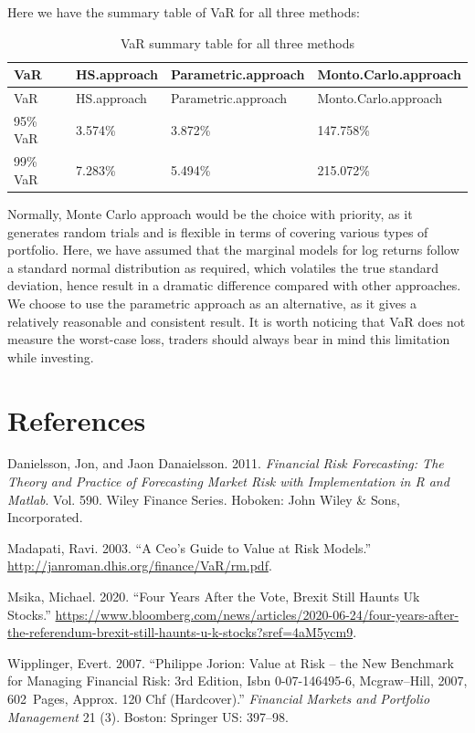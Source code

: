 \documentclass[]{article}
\begin{document}
Here we have the summary table of VaR for all three methods:

\begin{longtable}[]{@{}llll@{}}
\caption{VaR summary table for all three methods}\tabularnewline
\toprule
VaR & HS.approach & Parametric.approach &
Monto.Carlo.approach\tabularnewline
\midrule
\endfirsthead
\toprule
VaR & HS.approach & Parametric.approach &
Monto.Carlo.approach\tabularnewline
\midrule
\endhead
95\% VaR & 3.574\% & 3.872\% & 147.758\%\tabularnewline
99\% VaR & 7.283\% & 5.494\% & 215.072\%\tabularnewline
\bottomrule
\end{longtable}

Normally, Monte Carlo approach would be the choice with priority, as it
generates random trials and is flexible in terms of covering various
types of portfolio. Here, we have assumed that the marginal models for
log returns follow a standard normal distribution as required, which
volatiles the true standard deviation, hence result in a dramatic
difference compared with other approaches. We choose to use the
parametric approach as an alternative, as it gives a relatively
reasonable and consistent result. It is worth noticing that VaR does not
measure the worst-case loss, traders should always bear in mind this
limitation while investing.

\vspace{3cm}

\hypertarget{references}{%
\section{References}\label{references}}

\hypertarget{refs}{}
\leavevmode\hypertarget{ref-DanielssonJon2011FRFT}{}%
Danielsson, Jon, and Jaon Danaielsson. 2011. \emph{Financial Risk
Forecasting: The Theory and Practice of Forecasting Market Risk with
Implementation in R and Matlab}. Vol. 590. Wiley Finance Series.
Hoboken: John Wiley \& Sons, Incorporated.

\leavevmode\hypertarget{ref-Ravi}{}%
Madapati, Ravi. 2003. ``A Ceo's Guide to Value at Risk Models.''
\url{http://janroman.dhis.org/finance/VaR/rm.pdf}.

\leavevmode\hypertarget{ref-Michael}{}%
Msika, Michael. 2020. ``Four Years After the Vote, Brexit Still Haunts
Uk Stocks.''
\url{https://www.bloomberg.com/news/articles/2020-06-24/four-years-after-the-referendum-brexit-still-haunts-u-k-stocks?sref=4aM5ycm9}.

\leavevmode\hypertarget{ref-Wipplinger}{}%
Wipplinger, Evert. 2007. ``Philippe Jorion: Value at Risk -- the New
Benchmark for Managing Financial Risk: 3rd Edition, Isbn 0-07-146495-6,
Mcgraw--Hill, 2007, 602~Pages, Approx. 120 Chf (Hardcover).''
\emph{Financial Markets and Portfolio Management} 21 (3). Boston:
Springer US: 397--98.
\end{document}
